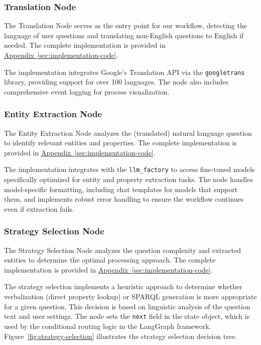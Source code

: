 \subsubsection{Translation Node}
The Translation Node serves as the entry point for our workflow, detecting the language of user questions and translating non-English questions to English if needed. The complete implementation is provided in \hyperref[code:translation-node]{Appendix~\ref{sec:implementation-code}}.

The implementation integrates Google's Translation API via the \texttt{googletrans} library, providing support for over 100 languages. The node also includes comprehensive event logging for process visualization.

\subsubsection{Entity Extraction Node}
The Entity Extraction Node analyzes the (translated) natural language question to identify relevant entities and properties. The complete implementation is provided in \hyperref[code:entity-extraction-node]{Appendix~\ref{sec:implementation-code}}.

The implementation integrates with the \texttt{llm\_factory} to access fine-tuned models specifically optimized for entity and property extraction tasks. The node handles model-specific formatting, including chat templates for models that support them, and implements robust error handling to ensure the workflow continues even if extraction fails.

\subsubsection{Strategy Selection Node}
The Strategy Selection Node analyzes the question complexity and extracted entities to determine the optimal processing approach. The complete implementation is provided in \hyperref[code:strategy-selection-node]{Appendix~\ref{sec:implementation-code}}.

The strategy selection implements a heuristic approach to determine whether verbalization (direct property lookup) or SPARQL generation is more appropriate for a given question. This decision is based on linguistic analysis of the question text and user settings. The node sets the \texttt{next} field in the state object, which is used by the conditional routing logic in the LangGraph framework. Figure~\ref{fig:strategy-selection} illustrates the strategy selection decision tree.

